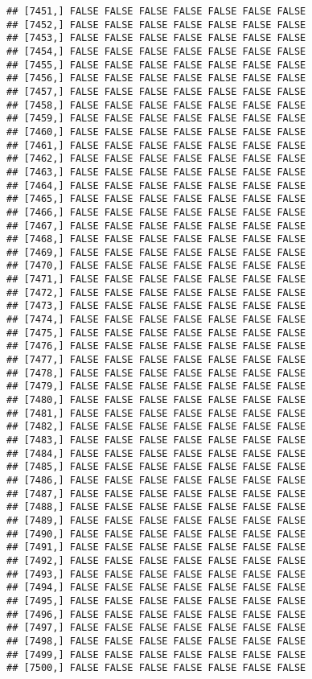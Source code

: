\documentclass[
]{article}
\begin{document}
\begin{verbatim}
## [7451,] FALSE FALSE FALSE FALSE FALSE FALSE FALSE
## [7452,] FALSE FALSE FALSE FALSE FALSE FALSE FALSE
## [7453,] FALSE FALSE FALSE FALSE FALSE FALSE FALSE
## [7454,] FALSE FALSE FALSE FALSE FALSE FALSE FALSE
## [7455,] FALSE FALSE FALSE FALSE FALSE FALSE FALSE
## [7456,] FALSE FALSE FALSE FALSE FALSE FALSE FALSE
## [7457,] FALSE FALSE FALSE FALSE FALSE FALSE FALSE
## [7458,] FALSE FALSE FALSE FALSE FALSE FALSE FALSE
## [7459,] FALSE FALSE FALSE FALSE FALSE FALSE FALSE
## [7460,] FALSE FALSE FALSE FALSE FALSE FALSE FALSE
## [7461,] FALSE FALSE FALSE FALSE FALSE FALSE FALSE
## [7462,] FALSE FALSE FALSE FALSE FALSE FALSE FALSE
## [7463,] FALSE FALSE FALSE FALSE FALSE FALSE FALSE
## [7464,] FALSE FALSE FALSE FALSE FALSE FALSE FALSE
## [7465,] FALSE FALSE FALSE FALSE FALSE FALSE FALSE
## [7466,] FALSE FALSE FALSE FALSE FALSE FALSE FALSE
## [7467,] FALSE FALSE FALSE FALSE FALSE FALSE FALSE
## [7468,] FALSE FALSE FALSE FALSE FALSE FALSE FALSE
## [7469,] FALSE FALSE FALSE FALSE FALSE FALSE FALSE
## [7470,] FALSE FALSE FALSE FALSE FALSE FALSE FALSE
## [7471,] FALSE FALSE FALSE FALSE FALSE FALSE FALSE
## [7472,] FALSE FALSE FALSE FALSE FALSE FALSE FALSE
## [7473,] FALSE FALSE FALSE FALSE FALSE FALSE FALSE
## [7474,] FALSE FALSE FALSE FALSE FALSE FALSE FALSE
## [7475,] FALSE FALSE FALSE FALSE FALSE FALSE FALSE
## [7476,] FALSE FALSE FALSE FALSE FALSE FALSE FALSE
## [7477,] FALSE FALSE FALSE FALSE FALSE FALSE FALSE
## [7478,] FALSE FALSE FALSE FALSE FALSE FALSE FALSE
## [7479,] FALSE FALSE FALSE FALSE FALSE FALSE FALSE
## [7480,] FALSE FALSE FALSE FALSE FALSE FALSE FALSE
## [7481,] FALSE FALSE FALSE FALSE FALSE FALSE FALSE
## [7482,] FALSE FALSE FALSE FALSE FALSE FALSE FALSE
## [7483,] FALSE FALSE FALSE FALSE FALSE FALSE FALSE
## [7484,] FALSE FALSE FALSE FALSE FALSE FALSE FALSE
## [7485,] FALSE FALSE FALSE FALSE FALSE FALSE FALSE
## [7486,] FALSE FALSE FALSE FALSE FALSE FALSE FALSE
## [7487,] FALSE FALSE FALSE FALSE FALSE FALSE FALSE
## [7488,] FALSE FALSE FALSE FALSE FALSE FALSE FALSE
## [7489,] FALSE FALSE FALSE FALSE FALSE FALSE FALSE
## [7490,] FALSE FALSE FALSE FALSE FALSE FALSE FALSE
## [7491,] FALSE FALSE FALSE FALSE FALSE FALSE FALSE
## [7492,] FALSE FALSE FALSE FALSE FALSE FALSE FALSE
## [7493,] FALSE FALSE FALSE FALSE FALSE FALSE FALSE
## [7494,] FALSE FALSE FALSE FALSE FALSE FALSE FALSE
## [7495,] FALSE FALSE FALSE FALSE FALSE FALSE FALSE
## [7496,] FALSE FALSE FALSE FALSE FALSE FALSE FALSE
## [7497,] FALSE FALSE FALSE FALSE FALSE FALSE FALSE
## [7498,] FALSE FALSE FALSE FALSE FALSE FALSE FALSE
## [7499,] FALSE FALSE FALSE FALSE FALSE FALSE FALSE
## [7500,] FALSE FALSE FALSE FALSE FALSE FALSE FALSE

\end{verbatim}
\end{document}
